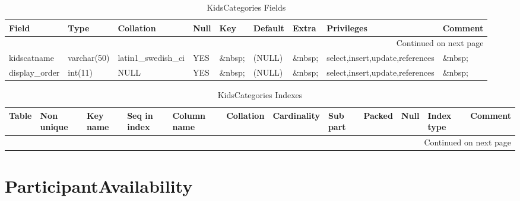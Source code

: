 \documentclass[tablesignature]{scrartcl}
\begin{document}
\begin{longtable}{|l|l|l|l|l|l|l|l|l|}
\caption{KidsCategories Fields} \label{tbl:kidscategoriesfields}\\
\hline
 Field             &  Type         &  Collation                &  Null     &  Key      &  Default  &  Extra              &  Privileges                       &  Comment \\
\hline
\endhead
\hline\multicolumn{9}{r}{Continued on next page}\
\endfoot
\endlastfoot
\hline
 kidscatid         &  int(11)      &  NULL                     &  \&nbsp;  &  PRI      &  (NULL)   &  auto\_{}increment  &  select,insert,update,references  &  \&nbsp;  \\
 kidscatname       &  varchar(50)  &  latin1\_{}swedish\_{}ci  &  YES      &  \&nbsp;  &  (NULL)   &  \&nbsp;            &  select,insert,update,references  &  \&nbsp;  \\
 display\_{}order  &  int(11)      &  NULL                     &  YES      &  \&nbsp;  &  (NULL)   &  \&nbsp;            &  select,insert,update,references  &  \&nbsp;  \\
\hline
\end{longtable}


\begin{longtable}{|l|l|l|l|l|l|l|l|l|l|l|l|}
\caption{KidsCategories Indexes} \label{tbl:kidscategoriesindexes}\\
\hline
 Table           &  Non unique  &  Key name  &  Seq in index  &  Column name  &  Collation  &  Cardinality  &  Sub part  &  Packed  &  Null     &  Index type  &  Comment \\
\hline
\endhead
\hline\multicolumn{12}{r}{Continued on next page}\
\endfoot
\endlastfoot
\hline
 KidsCategories  &           0  &  PRIMARY   &             1  &  kidscatid    &  A          &            4  &  (NULL)    &  (NULL)  &  \&nbsp;  &  BTREE       &  \&nbsp;  \\
\hline
\end{longtable}
\section{ParticipantAvailability}
\label{sec-5}
\end{document}
